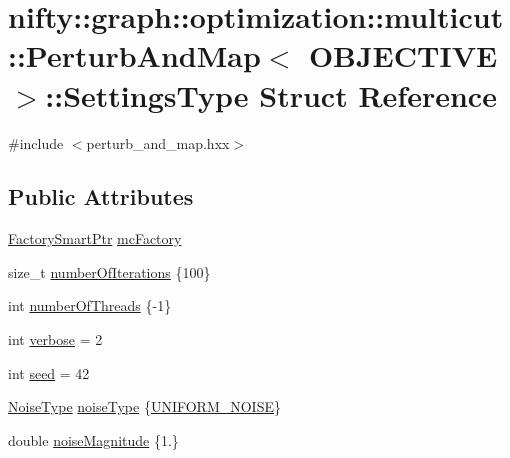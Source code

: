 \hypertarget{structnifty_1_1graph_1_1optimization_1_1multicut_1_1PerturbAndMap_1_1SettingsType}{}\section{nifty\+:\+:graph\+:\+:optimization\+:\+:multicut\+:\+:Perturb\+And\+Map$<$ O\+B\+J\+E\+C\+T\+I\+V\+E $>$\+:\+:Settings\+Type Struct Reference}
\label{structnifty_1_1graph_1_1optimization_1_1multicut_1_1PerturbAndMap_1_1SettingsType}


{\ttfamily \#include $<$perturb\+\_\+and\+\_\+map.\+hxx$>$}

\subsection*{Public Attributes}
\begin{DoxyCompactItemize}
\item 
\hyperlink{classnifty_1_1graph_1_1optimization_1_1multicut_1_1PerturbAndMap_a71ef6212402b9a6fef9e6f29cd0ba658}{Factory\+Smart\+Ptr} \hyperlink{structnifty_1_1graph_1_1optimization_1_1multicut_1_1PerturbAndMap_1_1SettingsType_a743374ab25d92d15248f4568b8a054f4}{mc\+Factory}
\item 
size\+\_\+t \hyperlink{structnifty_1_1graph_1_1optimization_1_1multicut_1_1PerturbAndMap_1_1SettingsType_a8bcb22e736648143ad5b433223f78984}{number\+Of\+Iterations} \{100\}
\item 
int \hyperlink{structnifty_1_1graph_1_1optimization_1_1multicut_1_1PerturbAndMap_1_1SettingsType_a9578f7286a2afc2a0ec8183980f7e883}{number\+Of\+Threads} \{-\/1\}
\item 
int \hyperlink{structnifty_1_1graph_1_1optimization_1_1multicut_1_1PerturbAndMap_1_1SettingsType_a307c01ac19d277e4dc8ef0ac9ed8f53b}{verbose} = 2
\item 
int \hyperlink{structnifty_1_1graph_1_1optimization_1_1multicut_1_1PerturbAndMap_1_1SettingsType_a36d5a3f29c0562248c28b0b488109cf4}{seed} = 42
\item 
\hyperlink{classnifty_1_1graph_1_1optimization_1_1multicut_1_1PerturbAndMap_a88d773cee3d185e28aecdc2c2707b744}{Noise\+Type} \hyperlink{structnifty_1_1graph_1_1optimization_1_1multicut_1_1PerturbAndMap_1_1SettingsType_a7d7ac2fce909dba39d477dec00da75d3}{noise\+Type} \{\hyperlink{classnifty_1_1graph_1_1optimization_1_1multicut_1_1PerturbAndMap_a88d773cee3d185e28aecdc2c2707b744a181e4a0a98b06f50587b3cf7f1b28c59}{U\+N\+I\+F\+O\+R\+M\+\_\+\+N\+O\+I\+S\+E}\}
\item 
double \hyperlink{structnifty_1_1graph_1_1optimization_1_1multicut_1_1PerturbAndMap_1_1SettingsType_aa284530e736b92fec50298c21df350f3}{noise\+Magnitude} \{1.\}
\end{DoxyCompactItemize}


